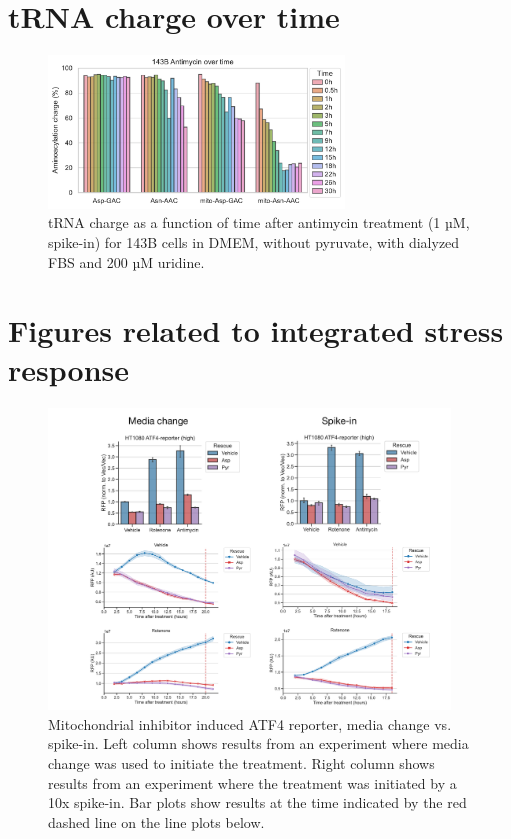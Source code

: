 \section{tRNA charge over time}
\begin{figure}[ht]
    \centering
    \includegraphics[width=0.7\textwidth]{figures/chap2/app/143B_Anti-time_Asp-Asn.pdf}
    \caption[Antimycin time-series in 143B, effect on tRNA charge.]{
        tRNA charge as a function of time after antimycin treatment (1 µM, spike-in) for 143B cells in DMEM, without pyruvate, with dialyzed FBS and 200 µM uridine.
    }
    \label{fig:app_ch2:143B_Anti_time}
\end{figure}




\newpage
\section{Figures related to integrated stress response}
\label{sec:ch2:app:ISR}
\begin{figure}[ht!]
    \centering
    \includegraphics[width=0.95\textwidth]{figures/chap2/app/atf4_chVSsp.pdf}
    \caption[ATF4 reporter, media change vs. spike-in.]{
    Mitochondrial inhibitor induced ATF4 reporter, media change vs. spike-in.
    Left column shows results from an experiment where media change was used to initiate the treatment.
    Right column shows results from an experiment where the treatment was initiated by a 10x spike-in.
    Bar plots show results at the time indicated by the red dashed line on the line plots below.
    }
    \label{fig:app_ch2:atf4_chVSsp}
\end{figure}

